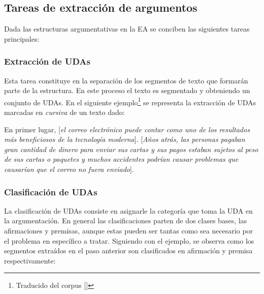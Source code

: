 
\subsection{Tareas de extracción de argumentos}

Dada las estructuras argumentativas en la EA se conciben las siguientes tareas principales:

\subsubsection{Extracción de UDAs}

Esta tarea constituye en la separación de los segmentos de texto que formarán parte de la estructura.
En este proceso el texto es segmentado y obteniendo un conjunto de UDAs. En el siguiente 
ejemplo\footnote{Traducido del corpus [\cite{stab2017parsing}]} se representa 
la extracción de UDAs marcadas en \emph{cursiva} de un texto dado:

\begin{adjustwidth}{25pt}{25pt}
    En primer lugar, [\emph{el correo electrónico puede contar como uno de los resultados
    más beneficiosos de la tecnología moderna}]. [\emph{Años atrás, las personas pagaban gran cantidad de dinero para 
    enviar sus cartas y sus pagos estaban sujetos al peso de sus cartas o paquetes y muchos accidentes podrían 
    causar problemas que causarían que el correo no fuera enviado}].
\end{adjustwidth}

\subsubsection{Clasificación de UDAs}

La clasificación de UDAs consiste en asignarle la categoría que toma la UDA en la argumentación. En general 
las clasificaciones parten de dos clases bases, las afirmaciones y premisas, aunque estas pueden ser tantas
como sea necesario por el problema en específico a tratar. Siguiendo con el ejemplo, se observa como los 
segmentos extraídos en el paso anterior son clasificados en afirmación y premisa respectivamente: 

